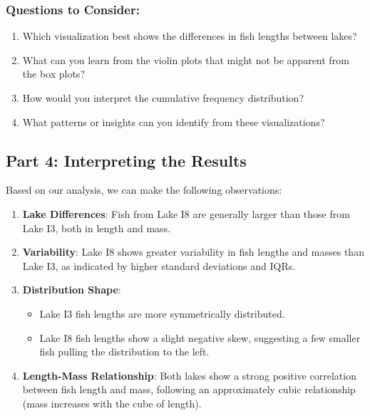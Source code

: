 \documentclass[
]{article}
\providecommand{\tightlist}{%
  \setlength{\itemsep}{0pt}\setlength{\parskip}{0pt}}\usepackage{longtable,booktabs,array}
\begin{document}
\subsubsection{}\label{section-4}

\subsubsection{Questions to Consider:}\label{questions-to-consider-2}

\begin{enumerate}
\def\labelenumi{\arabic{enumi}.}
\tightlist
\item
  Which visualization best shows the differences in fish lengths between
  lakes?
\item
  What can you learn from the violin plots that might not be apparent
  from the box plots?
\item
  How would you interpret the cumulative frequency distribution?
\item
  What patterns or insights can you identify from these visualizations?
\end{enumerate}

\subsection{Part 4: Interpreting the
Results}\label{part-4-interpreting-the-results}

Based on our analysis, we can make the following observations:

\begin{enumerate}
\def\labelenumi{\arabic{enumi}.}
\item
  \textbf{Lake Differences}: Fish from Lake I8 are generally larger than
  those from Lake I3, both in length and mass.
\item
  \textbf{Variability}: Lake I8 shows greater variability in fish
  lengths and masses than Lake I3, as indicated by higher standard
  deviations and IQRs.
\item
  \textbf{Distribution Shape}:

  \begin{itemize}
  \tightlist
  \item
    Lake I3 fish lengths are more symmetrically distributed.
  \item
    Lake I8 fish lengths show a slight negative skew, suggesting a few
    smaller fish pulling the distribution to the left.
  \end{itemize}
\item
  \textbf{Length-Mass Relationship}: Both lakes show a strong positive
  correlation between fish length and mass, following an approximately
  cubic relationship (mass increases with the cube of length).
\end{enumerate}
\end{document}
